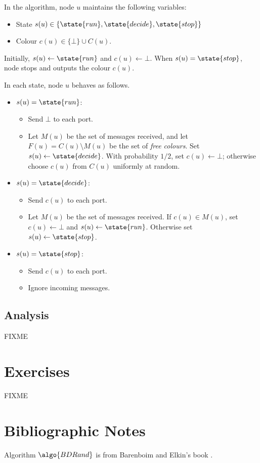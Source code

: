 In the algorithm, node $u$ maintains the following variables:
\begin{itemize}[noitemsep]
    \item State $s(u) \in \{\state{run},\state{decide},\state{stop}\}$
    \item Colour $c(u) \in \{\bot\} \cup C(u)$.
\end{itemize}
Initially, $s(u) \gets \state{run}$ and $c(u) \gets \bot$. When $s(u) = \state{stop}$, node stops and outputs the colour $c(u)$.

In each state, node $u$ behaves as follows.
\begin{itemize}
    \item $s(u) = \state{run}$:
    \begin{itemize}
        \item Send $\bot$ to each port.
        \item Let $M(u)$ be the set of messages received, and let $F(u) = C(u) \setminus M(u)$ be the set of \emph{free colours}. Set $s(u) \gets \state{decide}$. With probability $1/2$, set $c(u) \gets \bot$; otherwise choose $c(u)$ from $C(u)$ uniformly at random.
    \end{itemize}
    \item $s(u) = \state{decide}$:
    \begin{itemize}
        \item Send $c(u)$ to each port.
        \item Let $M(u)$ be the set of messages received. If $c(u) \in M(u)$, set $c(u) \gets \bot$ and $s(u) \gets \state{run}$. Otherwise set $s(u) \gets \state{stop}$.
    \end{itemize}
    \item $s(u) = \state{stop}$:
    \begin{itemize}
        \item Send $c(u)$ to each port.
        \item Ignore incoming messages.
    \end{itemize}
\end{itemize}



\subsection{Analysis}

FIXME



\section{Exercises}

\begin{ex}
    FIXME
\end{ex}



\section{Bibliographic Notes}

Algorithm $\algo{BDRand}$ is from Barenboim and Elkin's book \cite[Section 10.1]{barenboim13distributed}.
